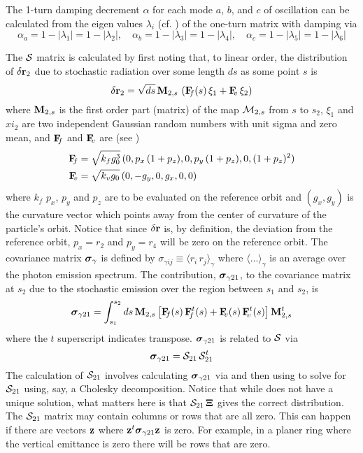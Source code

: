 The 1-turn damping decrement $\alpha$ for each mode $a$, $b$, and $c$ of oscillation can be
calculated from the eigen values $\lambda_i$ (cf. ) of the one-turn matrix with damping via
\begin{equation}
  \alpha_a = 1 - |\lambda_1| = 1 - |\lambda_2|, \quad 
  \alpha_b = 1 - |\lambda_3| = 1 - |\lambda_4|, \quad 
  \alpha_c = 1 - |\lambda_5| = 1 - |\lambda_6|
  \label{allall}
\end{equation}

The ${\cal S}$ matrix is calculated by first noting that, to linear order, the distribution of
$\delta{\bf r}_2$ due to stochastic radiation over some length $ds$ as some point $s$ is
\begin{equation}
  \delta{\bf r}_2 = \sqrt{ds} \, {\bf M}_{2,s} \, \left( {\bf F}_{\mkern-6 mu{f}}(s) \, \xi_1 + {\bf F}_{\mkern-6 mu{v}} \, \xi_2 \right)
\end{equation}
where ${\bf M}_{2,s}$ is the first order part (matrix) of the map ${\cal M}_{2,s}$ from $s$ to $s_2$,
$\xi_1$ and $xi_2$ are two independent Gaussian random numbers with unit sigma and zero mean, and
${\bf F}_{\mkern-6 mu{f}}$ and ${\bf F}_{\mkern-6 mu{v}}$ are (see )
\begin{align}
  {\bf F}_{\mkern-6 mu{f}} &= \sqrt{k_f g_0^3} \, (0, p_x \, (1 + p_z), 0, p_y \, (1 + p_z), 0, (1 + p_z)^2) \\
  {\bf F}_{\mkern-6 mu{v}} &= \sqrt{k_v g_0} \, (0, -g_y, 0, g_x, 0, 0)
  \label{fk000}
\end{align}
where $k_f$ $p_x$, $p_y$ and $p_z$ are to be evaluated on the reference orbit and $(g_x, g_y)$ is the
curvature vector which points away from the center of curvature of the particle's orbit. Notice that since
$\delta{\bf r}$ is, by definition, the deviation from the reference orbit, $p_x = r_2$ and $p_y = r_4$
will be zero on the reference orbit. The covariance matrix ${\boldsymbol{\sigma}}_\gamma$ is defined by
$\sigma_{\gamma ij} \equiv \langle r_i \, r_j \rangle_\gamma$ where $\langle \ldots \rangle_\gamma$
is an average over the photon emission spectrum. The contribution, ${\boldsymbol{\sigma}}_{\gamma21}$, to the
covariance matrix at $s_2$ due to the stochastic emission over the region between $s_1$ and $s_2$,
is
\begin{equation}
  {\boldsymbol{\sigma}}_{\gamma21} = \int_{s_1}^{s_2} ds \, 
    {\bf M}_{2,s} \, \big[ 
    {\bf F}_{\mkern-6 mu{f}}(s) \, {\bf F}_{\mkern-6 mu{f}}^t(s) + {\bf F}_{\mkern-6 mu{v}}(s) \, {\bf F}_{\mkern-6 mu{v}}^t(s) \big] \, {\bf M}_{2,s}^t
  \label{smvvm}
\end{equation}
where the $t$ superscript indicates transpose. ${\boldsymbol{\sigma}}_{\gamma21}$ is related to ${\cal S}$ via
\begin{equation}
  {\boldsymbol{\sigma}}_{\gamma21} = {\cal S}_{21} \, {\cal S}_{21}^t
  \label{sxx}
\end{equation}
The calculation of ${\cal S}_{21}$ involves calculating ${\boldsymbol{\sigma}}_{\gamma21}$ via  and then
using  to solve for ${\cal S}_{21}$ using, say, a Cholesky decomposition. Notice that while
 does not have a unique solution, what matters here is that ${\cal S}_{21} \, {\bf \Xi}$ gives
the correct distribution. The ${\cal S}_{21}$ matrix may contain columns or rows that are all
zero. This can happen if there are vectors ${\bf z}$ where ${\bf z}^t {\boldsymbol{\sigma}}_{\gamma21} {\bf z}$ is zero. For
example, in a planer ring where the vertical emittance is zero there will be rows that are zero.

